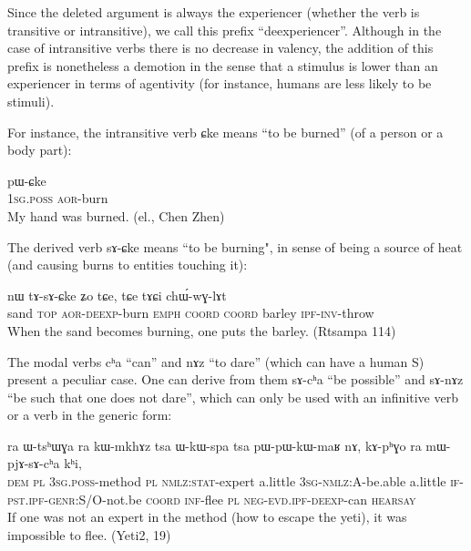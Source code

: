 \documentclass[oldfontcommands,oneside,a4paper,11pt]{memoir}
\newcommand{\ipa}[1]{{\phon #1}} %
\newcommand{\aor}{\textsc{aor}}
\newcommand{\coord}{\textsc{coord}}
\newcommand{\dem}{\textsc{dem}}
\newcommand{\deexp}{\textsc{deexp}}
\newcommand{\emphat}{\textsc{emph}}
\newcommand{\evd}{\textsc{evd}}
\newcommand{\genr}{\textsc{genr}}
\newcommand{\inftv}{\textsc{inf}}
\newcommand{\inv}{\textsc{inv}}
\newcommand{\ipf}{\textsc{ipf}}
\newcommand{\negat}{\textsc{neg}}
\newcommand{\nmlz}{\textsc{nmlz}}
\newcommand{\pl}{\textsc{pl}}
\newcommand{\poss}{\textsc{poss}}
\newcommand{\pst}{\textsc{pst}}
\newcommand{\sg}{\textsc{sg}}
\newcommand{\stat}{\textsc{stat}}
\newcommand{\topic}{\textsc{top}}
\begin{document}
Since the deleted argument is always the experiencer (whether the verb is transitive or intransitive), we call this prefix “deexperiencer”.  Although in the case of intransitive verbs there is no decrease in valency, the addition of this prefix is nonetheless a demotion in the sense that a stimulus is lower than an experiencer in terms of agentivity (for instance, humans are less likely to be stimuli). 

For instance, the intransitive verb \ipa{ɕke} means ``to be burned'' (of a person or a body part):
\begin{exe}
\ex
\gll    \ipa{a-jaʁ} 	\ipa{pɯ-ɕke} 	   \\
1\sg{}.\poss{} \aor{}-burn      \\
 \glt My hand was burned.   (el., Chen Zhen)
\end{exe}  

The derived verb \ipa{sɤ-ɕke} means ``to be burning", in sense of being a source of heat (and causing burns to entities touching it):

\begin{exe}
\ex
\gll \ipa{qambɯt} 	\ipa{nɯ} 	\ipa{tɤ-sɤ-ɕke} 	\ipa{ʑo} 	\ipa{tɕe,} 	\ipa{tɕe} 	\ipa{tɤɕi} 	\ipa{chɯ́-wɣ-lɤt}    \\
      sand \topic{} \aor{}-\deexp{}-burn \emphat{} \coord{} \coord{} barley \ipf{}-\inv{}-throw   \\
 \glt When the sand becomes burning, one puts the barley.  (Rtsampa 114)
\end{exe}  

The modal verbs \ipa{cʰa} ``can'' and \ipa{nɤz} ``to dare'' (which can have a human S) present a peculiar case. One can derive from them \ipa{sɤ-cʰa} ``be possible'' and  \ipa{sɤ-nɤz} ``be such that one does not dare'', which can only be used with an infinitive verb or a verb in the generic form:

\begin{exe}
\ex
\gll \ipa{nɯ} 	\ipa{ra} 	\ipa{ɯ-tsʰɯɣa} 	\ipa{ra} 	\ipa{kɯ-mkhɤz} 	\ipa{tsa} 	\ipa{ɯ-kɯ-spa} 	\ipa{tsa} 	\ipa{pɯ-pɯ-kɯ-maʁ} 	\ipa{nɤ,} 	\ipa{kɤ-pʰɣo} 	\ipa{ra} 	\ipa{mɯ-pjɤ-sɤ-cʰa} 	\ipa{kʰi,} \\
\dem{} \pl{} 3\sg{}.\poss{}-method \pl{} \nmlz{}:\stat{}-expert a.little 3\sg{}-\nmlz{}:A-be.able a.little \textsc{if}-\pst{}.\ipf{}-\genr{}:S/O-not.be \coord{} \inftv{}-flee \pl{} \negat{}-\evd{}.\ipf{}-\deexp{}-can \textsc{hearsay} \\
\glt If one was not an expert in the method (how to escape the yeti), it was impossible to flee.  (Yeti2, 19)
\end{exe}  
\end{document}

